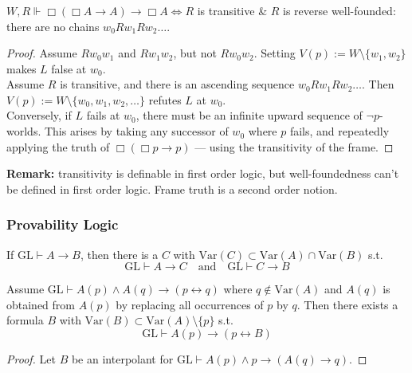 \documentclass[UTF8,aspectratio=43,11pt,colorlinks,compress,openany]{beamer}%
\begin{document}
\begin{frame}\frametitle{}
\begin{theorem}
$W,R\Vdash\Box(\Box A\to A)\to\Box A \iff R$ is transitive \& $R$ is reverse well-founded: there are no chains $w_0Rw_1Rw_2\dots$.
\end{theorem}
\begin{proof}
Assume $Rw_0w_1$ and $Rw_1w_2$, but not $Rw_0w_2$. Setting $V(p):=W\setminus\{w_1,w_2\}$ makes $L$ false at $w_0$.\\
Assume $R$ is transitive, and there is an ascending sequence $w_0Rw_1Rw_2\dots$. Then $V(p):=W\setminus\{w_0,w_1,w_2,\dots\}$ refutes $L$ at $w_0$.\\
Conversely, if $L$ fails at $w_0$, there must be an infinite upward sequence of $\neg p$-worlds. This arises by taking any successor of $w_0$ where $p$ fails, and repeatedly applying the truth of $\Box(\Box p\to p)$ --- using the transitivity of the frame.
\end{proof}
\textbf{Remark:} transitivity is definable in first order logic, but well-foundedness can't be defined in first order logic. Frame truth is a second order notion.
\end{frame}

\begin{frame}\frametitle{Provability Logic}
\setlength\abovedisplayskip{0pt}
\setlength\belowdisplayskip{0pt}
	\begin{theorem}
		If $\mathrm{GL}\vdash A\to B$, then there is a $C$ with $\mathrm{Var}(C)\subset \mathrm{Var}(A)\cap \mathrm{Var}(B)$ s.t.
		\[\mathrm{GL}\vdash A\to C\quad\mbox{and}\quad\mathrm{GL}\vdash C\to B\]
	\end{theorem}
	\begin{corollary}
		Assume $\mathrm{GL}\vdash A(p)\wedge A(q)\to(p\leftrightarrow q)$ where $q\notin \mathrm{Var}(A)$ and $A(q)$ is obtained from $A(p)$ by replacing all occurrences of $p$ by $q$. Then there exists a formula $B$ with $\mathrm{Var}(B)\subset \mathrm{Var}(A)\setminus\{p\}$ s.t.
		\[\mathrm{GL}\vdash A(p)\to(p\leftrightarrow B)\]
	\end{corollary}
	\begin{proof}
		Let $B$ be an interpolant for $\mathrm{GL}\vdash A(p)\wedge p\to(A(q)\to q)$.
	\end{proof}
\end{frame}
\end{document}
